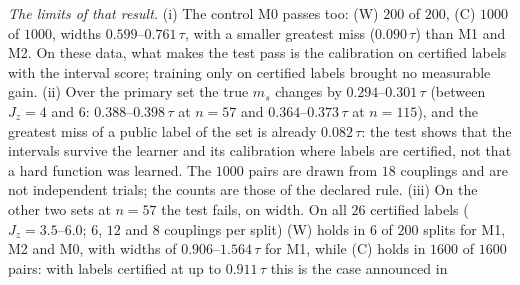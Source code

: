 \documentclass[aps,prx,onecolumn,10pt,nofootinbib,longbibliography,floatfix]{revtex4-2}
\theoremstyle{remark}
\newcommand{\Jz}{J_z}
\newcommand{\ms}{m_s}
\begin{document}
\emph{The limits of that result.} (i) The control M0 passes too: (W) $200$ of $200$, (C) $1000$ of $1000$, widths %
$0.599$--$0.761\,\tau$, with a smaller greatest miss ($0.090\,\tau$) than M1 and M2. On these data, what makes the %
test pass is the calibration on certified labels with the interval score; training only on certified labels
brought no measurable gain. (ii) Over the primary set the true $\ms$ changes by $0.294$--$0.301\,\tau$ (between %
$\Jz=4$ and $6$: $0.388$--$0.398\,\tau$ at $n=57$ and $0.364$--$0.373\,\tau$ at $n=115$), and the greatest miss of a %
public label of the set is already $0.082\,\tau$: the test shows that the intervals survive the learner and its %
calibration where labels are certified, not that a hard function was learned. The $1000$ pairs are drawn from $18$ %
couplings and are not independent trials; the counts are those of the declared rule. (iii) On the other two sets
at $n=57$ the test fails, on width. On all $26$ certified labels ($\Jz=3.5$--$6.0$; $6$, $12$ and $8$ couplings %
per split) (W) holds in $6$ of $200$ splits for M1, M2 and M0, with widths of $0.906$--$1.564\,\tau$ for M1, while %
(C) holds in $1600$ of $1600$ pairs: with labels certified at up to $0.911\,\tau$ this is the case announced in %
\end{document}
